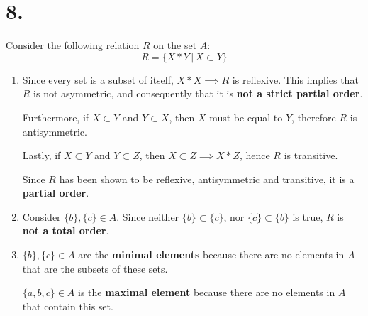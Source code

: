 \documentclass[12pt]{article}
\newcommand{\p}[1]{\item[\textnormal{(#1)}]}
\newenvironment{ps}
{\begin{enumerate}[leftmargin=0em, itemindent=1.5em]}
{\end{enumerate}}
\begin{document}
\section*{8.}
Consider the following relation \( R \) on the set \( A \):
    \[
        R = \{ X*Y \,|\, X \subset Y \}
    \]   
\begin{ps}

    \p{a} Since every set is a subset of itself, \( X*X \implies R\) is reflexive. This implies that
    \( R \) is not asymmetric, and consequently that it is \textbf{not a strict partial order}.

    Furthermore, if \( X \subset  Y\) and \( Y \subset X \), then \( X \) must be equal to \( Y \),
    therefore \( R \) is antisymmetric.

    Lastly, if \( X \subset Y \) and \( Y \subset Z \), then \( X \subset Z \implies X*Z \), hence \( R \) is
    transitive.

    Since \( R \) has been shown to be reflexive, antisymmetric and transitive, it is a
    \textbf{partial order}.

    \p{b} Consider \( \{b\}, \{c\} \in A \). Since neither \( \{b\} \subset \{c\} \), nor \( \{c\}
    \subset \{b\} \) is true, \( R \) is \textbf{not a total order}.

    \p{c} \( \{b\}, \{c\} \in A \) are the \textbf{minimal elements} because there are no elements
    in \( A \) that are the subsets of these sets.

    \( \{a,b,c\} \in A \) is the \textbf{maximal element} because there are no elements in \( A \)
    that contain this set.


\end{ps}
\end{document}
